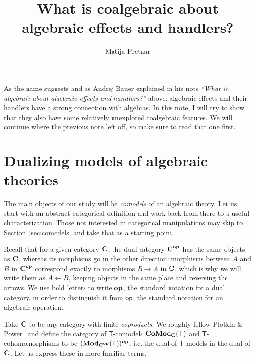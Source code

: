 \documentclass{amsart}
\newcommand{\theory}[1]{\mathsf{#1}} %
\newcommand{\ModC}[2]{\text{\textbf{Mod}}_{\category{#1}}(\theory{#2})} %
\newcommand{\ComodC}[2]{\text{\textbf{CoMod}}_{\category{#1}}(\theory{#2})} %
\newcommand{\opcat}[1]{\ensuremath{#1^{\text{\textbf{op}}}}}
\newcommand{\from}{\leftarrow}
\newcommand{\category}[1]{\text{\textbf{#1}}} %
\newcommand{\op}[1]{\mathsf{op}_{#1}} %
\begin{document}
\title{What is coalgebraic about algebraic effects and handlers?}

\author{Matija Pretnar}

\maketitle

As the name suggests and as Andrej Bauer explained in his note \emph{``What is algebraic about algebraic effects and handlers?''} above, algebraic effects and their handlers have a strong connection with algebras. In this note, I will try to show that they also have some relatively unexplored coalgebraic features. We will continue where the previous note left off, so make sure to read that one first.


\section{Dualizing models of algebraic theories}
\label{sec:dualizing-models}

The main objects of our study will be \emph{comodels} of an algebraic theory. Let us start with an abstract categorical definition and work back from there to a useful characterization. Those not interested in categorical manipulations may skip to Section~\ref{sec:comodels} and take that as a starting point.

Recall that for a given category $\category{C}$, the dual category $\opcat{\category{C}}$ has the same objects as $\category{C}$, whereas its morphisms go in the other direction: morphisms between $A$ and $B$ in $\opcat{\category{C}}$ correspond exactly to morphisms $B \to A$ in $\category{C}$, which is why we will write them as $A \from B$, keeping objects in the same place and reversing the arrows. We use bold letters to write $\text{\textbf{op}}$, the standard notation for a dual category, in order to distinguish it from $\op{}$, the standard notation for an algebraic operation.

Take $\category{C}$ to be any category with finite \emph{coproducts}. We roughly follow Plotkin \& Power~\cite{power} and define the category of $\theory{T}$-comodels $\ComodC{C}{T}$ and $\theory{T}$-cohomomorphisms to be $\opcat{(\ModC{\opcat{C}}{T})}$, i.e. the dual of $\theory{T}$-models in the dual of $\category{C}$. Let us express these in more familiar terms.
\end{document}
